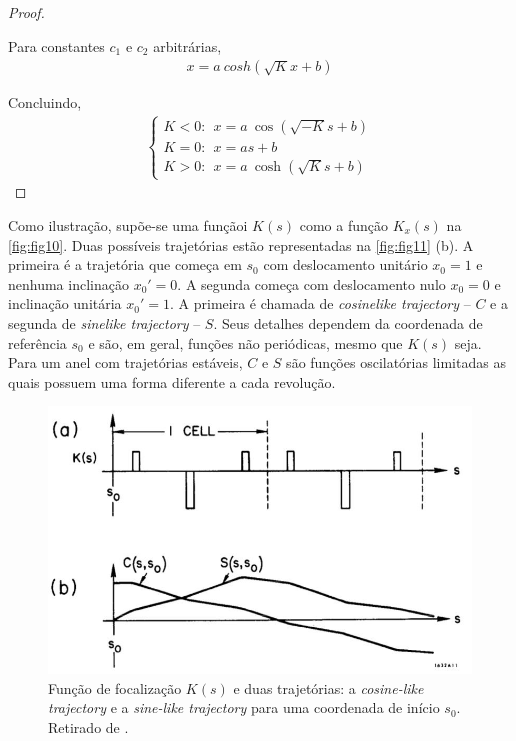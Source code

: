 \begin{proof}
\begin{itemize}
		Para constantes $c_1$ e $c_2$ arbitrárias,
		\begin{align*}
          x = a \ cosh(\sqrt{K}x + b)
		\end{align*}
	\end{itemize}
	
	Concluindo,
	\begin{align*}
        \left\{\begin{array}{l}
        K<0: \ \ x = a\ \cos(\sqrt{-K}s+b) \\
        K=0: \ \ x = as+b \\
        K>0: \ \ x = a\ \cosh(\sqrt{K}s+b)
        \end{array}\right.
	\end{align*}
\end{proof}

Como ilustração, supõe-se uma funçãoi $K(s)$ como a função $K_x(s)$ na \autoref{fig:fig10}. Duas possíveis trajetórias estão representadas na \autoref{fig:fig11} (b). A primeira é a trajetória que começa em $s_0$ com deslocamento unitário $x_0=1$ e nenhuma inclinação $x_0'=0$. A segunda começa com deslocamento nulo $x_0=0$ e inclinação unitária $x_0'= 1$. A primeira é chamada de \textit{cosinelike trajectory} -- $C$ e a segunda de \textit{sinelike trajectory} -- $S$. Seus detalhes dependem da coordenada de referência $s_0$ e são, em geral, funções não periódicas, mesmo que $K(s)$ seja. Para um anel com trajetórias estáveis, $C$ e $S$ são funções oscilatórias limitadas as quais possuem uma forma diferente a cada revolução.

\begin{figure}[!htb]
	\centering
	\includegraphics[width=0.7\linewidth]{./Figuras/fig11.jpeg}
	\caption{Função de focalização $K(s)$ e duas trajetórias: a \textit{cosine-like trajectory} e a \textit{sine-like trajectory} para uma coordenada de início $s_0 $. Retirado de \cite{sands1970physics}.}
	\label{fig:fig11}
\end{figure}
	
